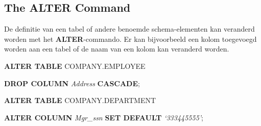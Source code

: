 \subsection{The ALTER Command}
De definitie van een tabel of andere benoemde schema-elementen kan veranderd worden met het \textbf{ALTER}-commando. Er kan bijvoorbeeld een kolom toegevoegd worden aan een tabel of de naam van een kolom kan veranderd worden.

\vspace{1mm}\hspace{10mm}
\textbf{ALTER TABLE} COMPANY.EMPLOYEE

\hspace{20mm}
\textbf{DROP COLUMN} \textit{Address} \textbf{CASCADE};

\vspace{1mm}\hspace{10mm}
\textbf{ALTER TABLE} COMPANY.DEPARTMENT

\hspace{20mm}
\textbf{ALTER COLUMN} \textit{Mgr\_ssn} \textbf{SET DEFAULT} \textit{`333445555'};